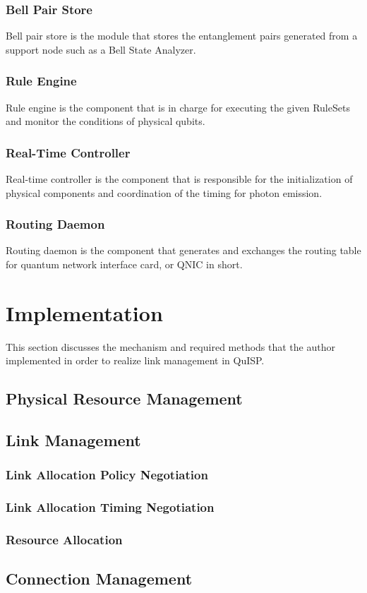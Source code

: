 \subsubsection{Bell Pair Store}
Bell pair store is the module that stores the entanglement pairs generated from a support node such as a Bell State Analyzer.

\subsubsection{Rule Engine}
Rule engine is the component that is in charge for executing the given RuleSets and monitor the conditions of physical qubits.

\subsubsection{Real-Time Controller}
Real-time controller is the component that is responsible for the initialization of physical components and coordination of the timing for photon emission.

\subsubsection{Routing Daemon}
Routing daemon is the component that generates and exchanges the routing table for quantum network interface card, or QNIC in short.

\section{Implementation}

This section discusses the mechanism and required methods that the author implemented in order to realize link management in QuISP.

\subsection{Physical Resource Management}

\subsection{Link Management}
\subsubsection{Link Allocation Policy Negotiation}
\subsubsection{Link Allocation Timing Negotiation}
\subsubsection{Resource Allocation}

\subsection{Connection Management}


